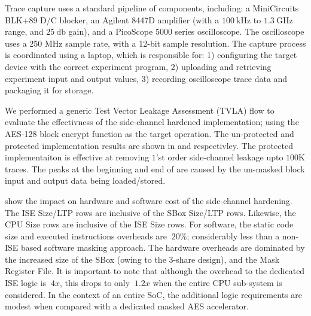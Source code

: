 Trace capture uses a standard pipeline of components, including:
a MiniCircuits BLK+89 D/C blocker,
an Agilent 8447D amplifier (with a $\SI{100}{\kilo\hertz}$ to $\SI{1.3}{\giga\hertz}$ range, and $\SI{25}{\decibel}$ gain),
and
a  PicoScope 5000 series oscilloscope.
The oscilloscope uses a 250 MHz sample rate, with a 12-bit sample resolution.
The capture process is coordinated using a laptop, which is responsible for:
1) configuring the target device with the correct experiment program,
2) uploading and retrieving experiment input and output values,
3) recording oscilloscope trace data and packaging it for storage.

We performed a generic Test Vector Leakage Assessment (TVLA) flow to evaluate
the effectivness of the side-channel hardened implementation;
using the AES-128 block encrypt function as the target operation.
The un-protected and protected implementation results are shown in
 and
 respectivley.
The protected implementaiton is effective at removing $1$'st
order side-channel leakage upto $100$K traces.
The peaks at the beginning and end of 
are caused by the un-masked block input and output data being loaded/stored.

 show the impact on hardware and software cost
of the side-channel hardening.
The ISE Size/LTP rows are inclusive of the SBox Size/LTP rows.
Likewise, the CPU Size rows are inclusive of the ISE Size rows.
For software, the static code size and executed instructions overheads are $~20\%$; considerably less than a non-ISE based software masking approach.
The hardware overheads are dominated by the increased size of the
SBox (owing to the 3-share design), and the Mask Register File.
It is important to note that although the overhead to the dedicated
ISE logic is $~4x$, this drops to only $~1.2x$ when the entire
CPU sub-system is considered.
In the context of an entire SoC, the additional logic requirements
are modest when compared with a dedicated masked AES accelerator.

